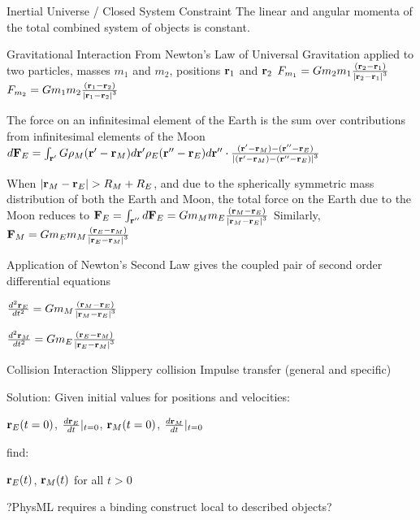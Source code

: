 \documentclass[10pt]{article}
\newif\ifpdf
\begin{document}
Inertial Universe / Closed System Constraint
The linear and angular momenta of the total combined system of objects is constant.

Gravitational Interaction
From Newton's Law of Universal Gravitation applied to two particles,
masses $m_1$ and $m_2$, positions ${\bf r}_1$ and ${\bf r}_2$
$F_{m_1} = G m_2m_1 {{({\bf r}_2- {\bf r}_1)} \over {\left|{\bf
        r}_2-{\bf r}_1\right|^3}}$
$F_{m_2} = G m_1m_2 {{({\bf r}_1- {\bf r}_2)} \over {\left|{\bf
        r}_1-{\bf r}_2\right|^3}}$

The force on an infinitesimal element of the Earth is the sum over
contributions from infinitesimal elements of the Moon
$d{\bf F}_E = \int_{{\bf r}'}G \rho_M({\bf r}'-{\bf r}_M)d{\bf r}'
    \rho_E({\bf r}''-{\bf r}_E)d{\bf r}'' \cdot {{{({\bf r}'-{\bf
        r}_M) - ({\bf r}''-{\bf r}_E )}} \over {\left|{({\bf r}'-{\bf
        r}_M) - ({\bf r}''-{\bf r}_E )}\right|^3}} $

When $\left|{\bf r}_M-{\bf r}_E\right| >
R_M+R_E$, and due to the spherically symmetric mass distribution of both the Earth and Moon, the total force on the Earth due to the Moon reduces to
${\bf F}_E = \int_{{\bf r}''} d{\bf F}_E = G m_Mm_E {{({\bf r}_M- {\bf
      r}_E)} \over {\left|{\bf r}_M-{\bf r}_E\right|^3}}$
Similarly,
${\bf F}_M = G m_Em_M {{({\bf r}_E- {\bf
      r}_M)} \over {\left|{\bf r}_E-{\bf r}_M\right|^3}}$

Application of Newton's Second Law gives the coupled pair of second order
differential equations

${{d^2{\bf r}_E}\over{dt^2}} = G m_M {{({\bf r}_M- {\bf
      r}_E)} \over {\left|{\bf r}_M-{\bf r}_E\right|^3}}$

${{d^2{\bf r}_M}\over{dt^2}} = G m_E {{({\bf r}_E- {\bf
      r}_M)} \over {\left|{\bf r}_E-{\bf r}_M\right|^3}}$

Collision Interaction
Slippery collision
Impulse transfer (general and specific)

Solution: 
Given initial values for positions and velocities:

${\bf r}_E(t=0)$, ${d{\bf r}_E\over{dt}} |_{t=0}$, ${\bf r}_M(t=0)$, ${d{\bf r}_M\over{dt}} |_{t=0}$

find:

 ${\bf r}_E(t)$, ${\bf r}_M(t)$ for all $t>0$


?PhysML requires a binding construct local to described objects?




\ifpdf
\DeclareGraphicsExtensions{.pdf, .jpg, .tif}
\else
{}
\fi

\begin{thebibliography}{99}


\end{thebibliography}


 
\end{document}
